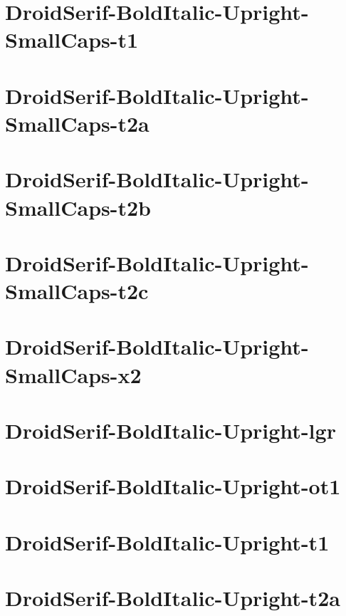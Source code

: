 \documentclass{article}
\begin{document}
\section{DroidSerif-BoldItalic-Upright-SmallCaps-t1}

\section{DroidSerif-BoldItalic-Upright-SmallCaps-t2a}

\section{DroidSerif-BoldItalic-Upright-SmallCaps-t2b}

\section{DroidSerif-BoldItalic-Upright-SmallCaps-t2c}

\section{DroidSerif-BoldItalic-Upright-SmallCaps-x2}

\section{DroidSerif-BoldItalic-Upright-lgr}

\section{DroidSerif-BoldItalic-Upright-ot1}

\section{DroidSerif-BoldItalic-Upright-t1}

\section{DroidSerif-BoldItalic-Upright-t2a}
\end{document}
